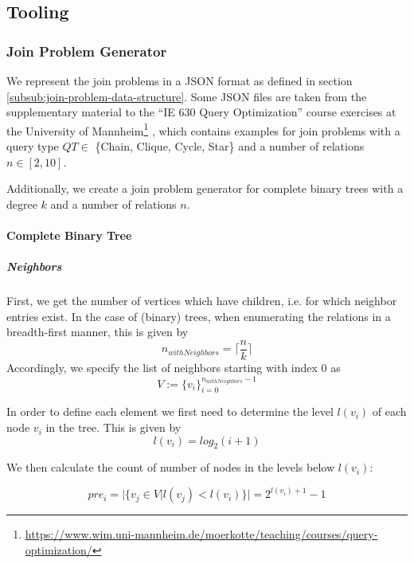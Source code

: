 \subsection{Tooling}

\subsubsection{Join Problem Generator}
We represent the join problems in a JSON format as defined in section \ref{subsub:join-problem-data-structure}. 
Some JSON files are taken from the supplementary material to the ``IE 630 Query Optimization'' course exercises at the University of Mannheim\footnote{\url{https://www.wim.uni-mannheim.de/moerkotte/teaching/courses/query-optimization/}}
, which contains examples for join problems with a query type $QT \in $ \{Chain, Clique, Cycle, Star\} and a number of relations $n \in [2,10]$.

Additionally, we create a join problem generator for complete binary trees with a degree $k$ and a number of relations $n$.

\setlength{\belowdisplayskip}{10pt}
\setlength{\belowdisplayshortskip}{50pt}
\setlength{\abovedisplayskip}{10pt}
\setlength{\abovedisplayshortskip}{10pt}

\paragraph{Complete Binary Tree}
\subparagraph{Neighbors}
First, we get the number of vertices which have children, i.e. for which neighbor entries exist.
In the case of (binary) trees, when enumerating the relations in a breadth-first manner, this is given by 
\begin{equation}
    n_{withNeighbors} = \lceil\frac{n}{k}\rceil
\end{equation}
Accordingly, we specify the list of neighbors starting with index 0 as
\begin{equation}
   V := \{v_i\}_{i=0}^{n_{withNeighbors}-1}
\end{equation} 

In order to define each element we first need to determine the level $l(v_i)$ of each node $v_i$ in the tree. This is given by
\begin{equation}
    l(v_i) = log_2(i+1)
\end{equation}

We then calculate the count of number of nodes in the levels below $l(v_i)$:

\begin{equation}
     pre_i = \vert \{v_j \in V \vert l(v_j) < l(v_i)\} \vert = 2^{l(v_i) + 1} - 1
\end{equation}

